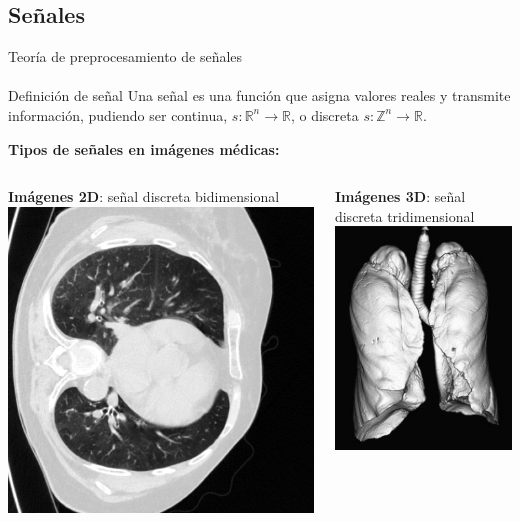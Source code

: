 \documentclass{beamer}
\begin{document}
\subsection{Señales}
\begin{frame}{Teoría de preprocesamiento de señales}
\framesubtitle{\insertsubsectionhead}
\begin{block}{Definición de señal}
Una señal es una función que asigna valores reales y transmite información, pudiendo ser continua, $s : \mathbb{R}^n \rightarrow \mathbb{R}$, o discreta $s : \mathbb{Z}^n \rightarrow \mathbb{R}$.
\end{block}


\begin{center}
\textbf{Tipos de señales en imágenes médicas:}
\end{center}

\vspace{0.5em}

\begin{columns}[c]
        \centering
        \textbf{Imágenes 2D}: señal discreta bidimensional \\[0.5em]
        \includegraphics[width=0.65\linewidth]{img/lung2d.png}
        
        \centering
        \textbf{Imágenes 3D}: señal discreta tridimensional \\[0.5em]
        \includegraphics[width=0.5\linewidth]{img/lung3d.png}
\end{columns}


\end{frame}
\end{document}
